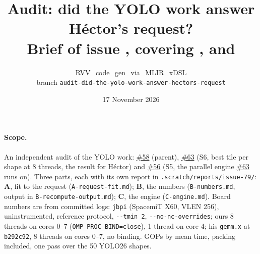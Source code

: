 \documentclass[10pt,a4paper]{article}
\title{\vspace{-1.2cm}\textbf{Audit: did the YOLO work answer H\'ector's request?}\\[2pt]
\large Brief of issue \iss{79}, covering \iss{58}, \iss{63} and \iss{56}}
\author{RVV\_code\_gen\_via\_MLIR\_xDSL\\ \small branch \texttt{audit-did-the-yolo-work-answer-hectors-request}}
\date{17 November 2026}
\newcommand{\iss}[1]{\href{https://github.com/JieGH/RVV_code_gen_via_MLIR_xDSL/issues/#1}{\##1}}
\begin{document}
\maketitle
\vspace{-0.8cm}

\paragraph{Scope.} An independent audit of the YOLO work: \iss{58} (parent), \iss{63} (S6, best tile per shape at 8
threads, the result for H\'ector) and \iss{56} (S5, the parallel engine \iss{63} runs on). Three parts, each with its
own report in \texttt{.scratch/reports/issue-79/}: \textbf{A}, fit to the request (\texttt{A-request-fit.md});
\textbf{B}, the numbers (\texttt{B-numbers.md}, output in \texttt{B-recompute-output.md}); \textbf{C}, the engine
(\texttt{C-engine.md}). Board numbers are from committed logs: \texttt{jbpi} (SpacemiT X60, VLEN 256),
uninstrumented, reference protocol, \texttt{-{}-tmin 2}, \texttt{-{}-no-nc-overrides}; ours 8 threads on cores 0--7
(\texttt{OMP\_PROC\_BIND=close}), 1 thread on core 4; his \texttt{gemm.x} at \texttt{b292c92}, 8 threads on cores
0--7, no binding. GOPs by mean time, packing included, one pass over the 50 YOLO26 shapes.
\end{document}
